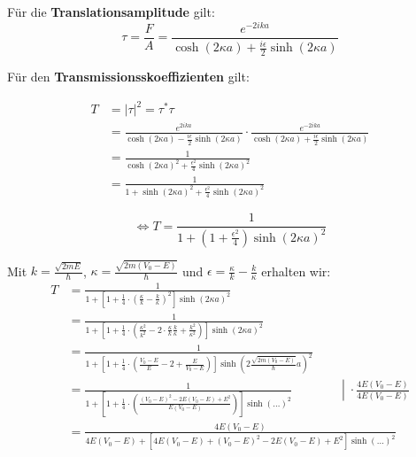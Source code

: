 Für die \textbf{Translationsamplitude} gilt:
\[ \tau = \frac{F}{A} = \frac{e^{-2 i k a}}
               {\cosh(2 \kappa a) + \frac{i \epsilon}{2}\sinh(2 \kappa a)} \]

Für den \textbf{Transmissionsskoeffizienten} gilt:

\begin{align*}
  T &= |\tau|^2 = \tau^*\tau \\
    &= \frac{e^{2 i k a}}
          {\cosh(2 \kappa a) - \frac{i \epsilon}{2}\sinh(2 \kappa a)} \cdot
           \frac{e^{-2 i k a}}
           {\cosh(2 \kappa a) + \frac{i \epsilon}{2}\sinh(2 \kappa a)}\\
    &= \frac{1}{\cosh(2 \kappa a)^2
         + \frac{\epsilon^2}{4}\sinh(2 \kappa a)^2}\\
    &= \frac{1}{1+\sinh(2 \kappa a)^2
         + \frac{\epsilon^2}{4}\sinh(2 \kappa a)^2}
\end{align*}

  \begin{equation}
    \label{eq:28}
    \Leftrightarrow T = \frac{1}{1+(1 + 
      \frac{\epsilon^2}{4})\sinh(2 \kappa a)^2}
  \end{equation}

Mit \(  k = \frac {\sqrt{2 m E}}\hbar  \),
\( \kappa=\frac{\sqrt{2 m (V_0 - E)}}\hbar \) und 
\( \epsilon = \frac \kappa k - \frac k \kappa \) erhalten wir:
{\allowdisplaybreaks
\begin{align*}
 T &= \frac{1}{1+\left[1 + \frac{1}{4} \cdot
           \left(\frac \kappa k - \frac k \kappa\right)^2
           \right]\sinh(2 \kappa a)^2}\\
   &= \frac{1}{1+\left[1 + \frac{1}{4} \cdot
           \left(\frac {\kappa^2}{k^2}
             -2\cdot \frac \kappa k \frac k \kappa
             + \frac {k^2}{\kappa^2}
           \right)
           \right]\sinh(2 \kappa a)^2}\\
   &= \frac{1}{1+\left[1 + \frac{1}{4} \cdot
           \left(\frac {V_0-E}{E}
             -2
             + \frac {E}{V_0-E}
           \right)
           \right]\sinh\left(2 \frac{\sqrt{2 m (V_0 - E)}}\hbar a\right)^2}\\
   &= \frac{1}{1+\left[1 + \frac{1}{4} \cdot
           \left(\frac {(V_0-E)^2-2E(V_0-E)+E^2}{E(V_0-E)}
           \right)
           \right]\sinh(\dots)^2} 
         \qquad \qquad
           \left|\;\cdot \frac{4 E (V_0-E)}{4 E (V_0-E)} \right. \\
   &= \frac{4 E (V_0-E)}{4 E (V_0-E)+\left[4 E (V_0-E) 
           +(V_0-E)^2-2E(V_0-E)+E^2
           \right]\sinh(\dots)^2}
\end{align*}
}

